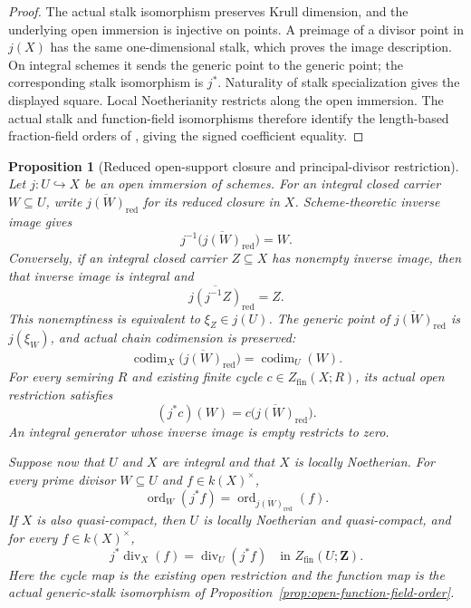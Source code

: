 \documentclass[11pt]{article}
\newtheorem{proposition}[theorem]{Proposition}
\theoremstyle{definition}
\theoremstyle{remark}
\begin{document}
\begin{proof}
The actual stalk isomorphism preserves Krull dimension, and the
underlying open immersion is injective on points. A preimage of a
divisor point in \(j(X)\) has the same one-dimensional stalk,
which proves the image description. On integral
schemes it sends the generic point to the generic point; the
corresponding stalk isomorphism is \(j^*\). Naturality of stalk
specialization gives the displayed square. Local Noetherianity
restricts along the open immersion. The actual stalk and function-field
isomorphisms therefore identify the length-based fraction-field
orders of \cite{StacksLocalOrderOfVanishing,StacksSchemeOrderOfVanishing},
giving the signed coefficient equality.
\end{proof}

\begin{proposition}[Reduced open-support closure and principal-divisor restriction]
\label{prop:open-principal-divisor}
Let \(j:U\hookrightarrow X\) be an open immersion of schemes.
For an integral closed carrier \(W\subseteq U\), write
\(\overline{j(W)}_{\mathrm{red}}\) for its reduced closure in \(X\).
Scheme-theoretic inverse image gives
\[
 j^{-1}\bigl(\overline{j(W)}_{\mathrm{red}}\bigr)=W.
\]
Conversely, if an integral closed carrier \(Z\subseteq X\) has
nonempty inverse image, then that inverse image is integral and
\[
 \overline{j(j^{-1}Z)}_{\mathrm{red}}=Z.
\]
This nonemptiness is equivalent to \(\xi_Z\in j(U)\).
The generic point of \(\overline{j(W)}_{\mathrm{red}}\) is
\(j(\xi_W)\), and actual chain codimension is preserved:
\[
 \operatorname{codim}_X\bigl(\overline{j(W)}_{\mathrm{red}}\bigr)
       =\operatorname{codim}_U(W).
\]
For every semiring \(R\) and existing finite cycle
\(c\in Z_{\mathrm{fin}}(X;R)\), its actual open restriction satisfies
\[
 (j^*c)(W)=c\bigl(\overline{j(W)}_{\mathrm{red}}\bigr).
\]
An integral generator whose inverse image is empty restricts to zero.

Suppose now that \(U\) and \(X\) are integral and that \(X\) is
locally Noetherian. For every prime divisor \(W\subseteq U\) and
\(f\in k(X)^\times\),
\[
 \operatorname{ord}_W(j^*f)
    =\operatorname{ord}_{\overline{j(W)}_{\mathrm{red}}}(f).
\]
If \(X\) is also quasi-compact, then \(U\) is locally Noetherian
and quasi-compact, and for every \(f\in k(X)^\times\),
\[
 j^*\operatorname{div}_X(f)
      =\operatorname{div}_U(j^*f)
      \quad\text{in }Z_{\mathrm{fin}}(U;\mathbf Z).
\]
Here the cycle map is the existing open restriction and the
function map is the actual generic-stalk isomorphism of
Proposition~\ref{prop:open-function-field-order}.
\end{proposition}
\end{document}
